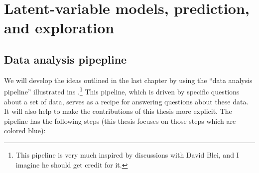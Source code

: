 \label{sec:pipeline}

\section{Latent-variable models, prediction, and exploration}

\subsection{Data analysis pipepline}
\label{sec:data_analysis_pipeline}
We will develop the ideas outlined in the last chapter by using the
``data analysis pipeline'' illustrated ins
.\footnote{This pipeline is very much
  inspired by discussions with David Blei, and I imagine he should get
  credit for it.} This pipeline, which is driven by specific questions
about a set of data, serves as a recipe for answering questions about
these data.  It will also help to make the contributions of this
thesis more explicit. The pipeline has the following steps (this
thesis focuses on those steps which are colored blue):


